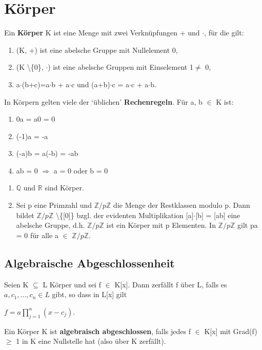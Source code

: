 \section{Körper}
\begin{definition}
Ein \textbf{Körper} K ist eine Menge mit zwei Verknüpfungen + und $\cdot$, für die gilt:
\begin{enumerate}
\item (K, +) ist eine abelsche Gruppe mit Nullelement 0,
\item (K \textbackslash \{0\}, $\cdot$) ist eine abelsche Gruppen mit Einselement 1$\neq$ 0,
\item a$\cdot$(b+c)=a$\cdot$b + a$\cdot$c und (a+b)$\cdot$c = a$\cdot$c + a$\cdot$b.
\end{enumerate}
\end{definition}

\begin{remark}
In Körpern gelten viele der ‘üblichen’ \textbf{Rechenregeln}. Für a, b $\in$ K ist:
\begin{enumerate} 
\item 0a = a0 = 0 
\item (-1)a = -a
\item (-a)b = a(-b) = -ab
\item ab = 0 $\Rightarrow$ a = 0 oder b = 0
\end{enumerate}
\end{remark}

\begin{example}
\leavevmode
\begin{enumerate}
\item $\mathbb{Q}$ und $\mathbb{R}$ sind Körper.
\item Sei p eine Primzahl und $\mathbb{Z}/p\mathbb{Z}$ die Menge der Restklassen modulo p. Dann bildet $\mathbb{Z}/p\mathbb{Z}$ \textbackslash\{[0]\} bzgl. der evidenten Multiplikation [a]$\cdot$[b] = [ab] eine abelsche Gruppe, d.h. $\mathbb{Z}/p\mathbb{Z}$ ist ein Körper mit p Elementen. In $\mathbb{Z}/p\mathbb{Z}$ gilt pa = 0 für alle a $\in$ $\mathbb{Z}/p\mathbb{Z}$.
\end{enumerate}
\end{example}

\subsection{Algebraische Abgeschlossenheit}
\begin{definition}
Seien K $\subseteq$ L Körper und sei f $\in$ K[x]. Dann zerfällt f über L, falls es $a, c_1, …, c_n \in L$ gibt, so dass in L[x] gilt
\begin{center}
$f = a \prod\limits_{j=1}^{n}(x - c_j)$.
\end{center}
Ein Körper K ist \textbf{algebraisch abgeschlossen}, falls jedes f $\in$ K[x] mit Grad(f) $\ge$ 1 in K eine Nullstelle hat (also über K zerfällt).
\end{definition}

